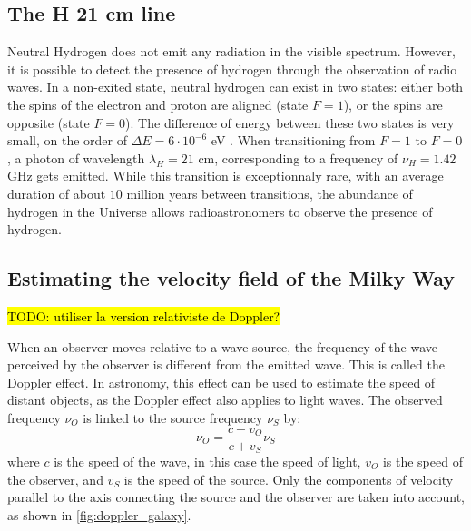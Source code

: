 \subsection{The H 21 cm line}
Neutral Hydrogen does not emit any radiation in the visible spectrum.
However, it is possible to detect the presence of hydrogen through the observation of radio waves.
In a non-exited state, neutral hydrogen can exist in two states: either both the spins of the electron and proton are aligned (state $F=1$), or the spins are opposite (state $F=0$).
The difference of energy between these two states is very small, on the order of $\Delta E = 6 \cdot 10^{-6}$ \si{\electronvolt} \cite{frederic_courbin_introduction_nodate}.
When transitioning from $F=1$ to $F=0$, a photon of wavelength $\lambda_H = 21$ cm, corresponding to a frequency of $\nu_H = 1.42$ GHz gets emitted.
While this transition is exceptionnaly rare, with an average duration of about $10$ million years between transitions, the abundance of hydrogen in the Universe allows radioastronomers to observe the presence of hydrogen.



\subsection{Estimating the velocity field of the Milky Way}
\hl{TODO: utiliser la version relativiste de Doppler?}

When an observer moves relative to a wave source, the frequency of the wave perceived by the observer is different from the emitted wave. This is called the Doppler effect. In astronomy, this effect can be used to estimate the speed of distant objects, as the Doppler effect also applies to light waves. The observed frequency $\nu_O$ is linked to the source frequency $\nu_S$ by:
\begin{equation}
    \nu_O = \frac{c - v_O}{c + v_S} \nu_S
\end{equation}
where $c$ is the speed of the wave, in this case the speed of light, $v_O$ is the speed of the observer, and $v_S$ is the speed of the source. Only the components of velocity parallel to the axis connecting the source and the observer are taken into account, as shown in \autoref{fig:doppler_galaxy}.

